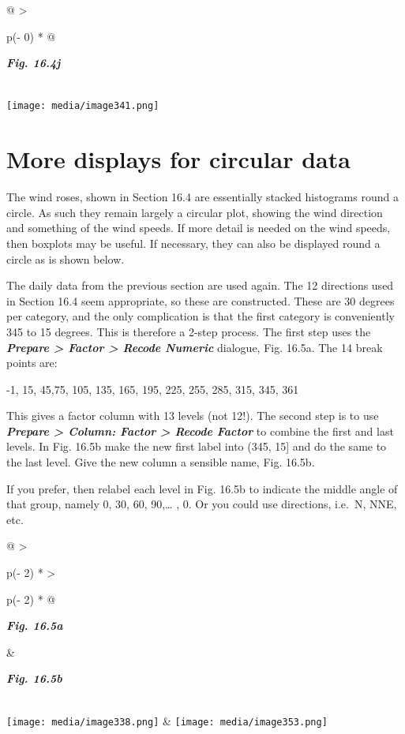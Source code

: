 \documentclass[
  letterpaper,
  DIV=11,
  numbers=noendperiod]{scrreprt}
\begin{document}
\begin{longtable}[]{@{}
  >{\raggedright\arraybackslash}p{(\columnwidth - 0\tabcolsep) * }@{}}
\toprule\noalign{}
\begin{minipage}[b]{\linewidth}\raggedright
\textbf{\emph{Fig. 16.4j}}
\end{minipage} \\
\midrule\noalign{}
\endhead
\bottomrule\noalign{}
\endlastfoot
\texttt{[image: media/image341.png]} \\
\end{longtable}

\section{More displays for circular
data}\label{more-displays-for-circular-data}

The wind roses, shown in Section 16.4 are essentially stacked histograms
round a circle. As such they remain largely a circular plot, showing the
wind direction and something of the wind speeds. If more detail is
needed on the wind speeds, then boxplots may be useful. If necessary,
they can also be displayed round a circle as is shown below.

The daily data from the previous section are used again. The 12
directions used in Section 16.4 seem appropriate, so these are
constructed. These are 30 degrees per category, and the only
complication is that the first category is conveniently 345 to 15
degrees. This is therefore a 2-step process. The first step uses the
\textbf{\emph{Prepare \textgreater{} Factor \textgreater{} Recode
Numeric}} dialogue, Fig. 16.5a. The 14 break points are:

-1, 15, 45,75, 105, 135, 165, 195, 225, 255, 285, 315, 345, 361

This gives a factor column with 13 levels (not 12!). The second step is
to use \textbf{\emph{Prepare \textgreater{} Column: Factor
\textgreater{} Recode Factor}} to combine the first and last levels. In
Fig. 16.5b make the new first label into (345, 15{]} and do the same to
the last level. Give the new column a sensible name, Fig. 16.5b.

If you prefer, then relabel each level in Fig. 16.5b to indicate the
middle angle of that group, namely 0, 30, 60, 90,\ldots{} , 0. Or you
could use directions, i.e.~N, NNE, etc.

\begin{longtable}[]{@{}
  >{\raggedright\arraybackslash}p{(\columnwidth - 2\tabcolsep) * }
  >{\raggedright\arraybackslash}p{(\columnwidth - 2\tabcolsep) * }@{}}
\toprule\noalign{}
\begin{minipage}[b]{\linewidth}\raggedright
\textbf{\emph{Fig. 16.5a}}
\end{minipage} & \begin{minipage}[b]{\linewidth}\raggedright
\textbf{\emph{Fig. 16.5b}}
\end{minipage} \\
\midrule\noalign{}
\endhead
\bottomrule\noalign{}
\endlastfoot
\texttt{[image: media/image338.png]} &
\texttt{[image: media/image353.png]} \\
\end{longtable}
\end{document}
